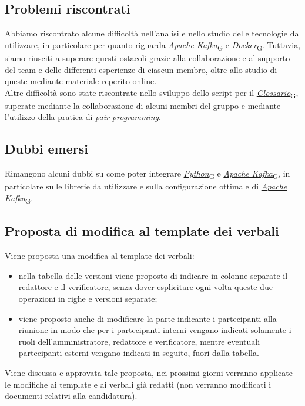 \documentclass[italian,12pt]{article}
\begin{document}
\subsection{Problemi riscontrati}
Abbiamo riscontrato alcune difficoltà nell'analisi e nello studio delle tecnologie da utilizzare, in particolare per quanto riguarda \href{https://7last.github.io/docs/rtb/documentazione-interna/glossario#apache-kafka}{\textit{Apache Kafka}\textsubscript{G}} e \href{https://7last.github.io/docs/rtb/documentazione-interna/glossario#docker}{\textit{Docker}\textsubscript{G}}. Tuttavia, siamo riusciti a superare questi ostacoli grazie alla collaborazione e al supporto del team e delle differenti esperienze di ciascun membro, oltre allo studio di queste mediante materiale reperito online. \\
Altre difficoltà sono state riscontrate nello sviluppo dello script per il \href{https://7last.github.io/docs/rtb/documentazione-interna/glossario#glossario}{\textit{Glossario}\textsubscript{G}}, superate mediante la collaborazione di alcuni membri del gruppo e mediante l'utilizzo della pratica di \textit{pair programming}.

\subsection{Dubbi emersi}
Rimangono alcuni dubbi su come poter integrare \href{https://7last.github.io/docs/rtb/documentazione-interna/glossario#python}{\textit{Python}\textsubscript{G}} e \href{https://7last.github.io/docs/rtb/documentazione-interna/glossario#apache-kafka}{\textit{Apache Kafka}\textsubscript{G}}, in particolare sulle librerie da utilizzare e sulla configurazione ottimale di \href{https://7last.github.io/docs/rtb/documentazione-interna/glossario#apache-kafka}{\textit{Apache Kafka}\textsubscript{G}}.

\subsection{Proposta di modifica al template dei verbali}
Viene proposta una modifica al template dei verbali:
\begin{itemize}
	\item nella tabella delle versioni viene proposto di indicare in colonne separate il redattore e il verificatore, senza dover esplicitare ogni volta queste due operazioni in righe e versioni separate;
	\item viene proposto anche di modificare la parte indicante i partecipanti alla riunione in modo che per i partecipanti interni vengano indicati solamente i ruoli dell'amministratore, redattore e verificatore, mentre eventuali partecipanti esterni vengano indicati in seguito, fuori dalla tabella.
\end{itemize}
Viene discussa e approvata tale proposta, nei prossimi giorni verranno applicate le modifiche ai template e ai verbali già redatti (non verranno modificati i documenti relativi alla candidatura).
\end{document}
